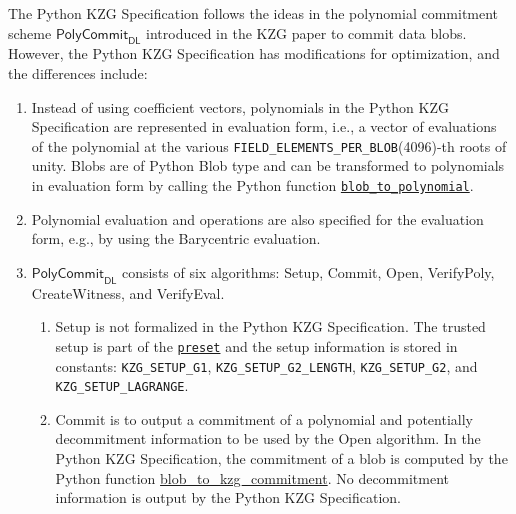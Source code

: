 \documentclass[12pt]{galois-whitepaper}
\begin{document}
The Python KZG Specification follows the ideas in the polynomial commitment scheme $\textsf{PolyCommit}_{\textsf{DL}}$ introduced in the KZG paper to commit data blobs. 
However, the Python KZG Specification has modifications for optimization, and the differences include:
\begin{enumerate}
    \item Instead of using coefficient vectors, polynomials in the Python KZG Specification are represented in evaluation form, i.e., a vector of evaluations of the polynomial at the various \texttt{FIELD\_ELEMENTS\_PER\_BLOB}(4096)-th roots of unity.
    Blobs are of Python Blob type and can be transformed to polynomials in evaluation form by calling the Python function \href{https://github.com/ethereum/consensus-specs/blob/dev/specs/deneb/polynomial-commitments.md\#blob_to_polynomial}{\texttt{blob\_to\_polynomial}}.

    \item Polynomial evaluation and operations are also specified for the evaluation form, e.g., by using the Barycentric evaluation.
    
    \item $\textsf{PolyCommit}_{\textsf{DL}}$ consists of six algorithms: \textsf{Setup}, \textsf{Commit}, \textsf{Open}, \textsf{VerifyPoly}, \textsf{CreateWitness}, and \textsf{VerifyEval}.
    
    \begin{enumerate}
    
    \item \textsf{Setup} is not formalized in the Python KZG Specification.
    The trusted setup is part of the \href{https://github.com/ethereum/consensus-specs/blob/dev/specs/deneb/polynomial-commitments.md#verify_kzg_proof_batch}{\texttt{preset}} 
    and the setup information is stored in constants: 
    \texttt{KZG\_SETUP\_G1}, 
    \texttt{KZG\_SETUP\_G2\_LENGTH}, 
    \texttt{KZG\_SETUP\_G2}, 
    and \texttt{KZG\_SETUP\_LAGRANGE}.
    
    \item \textsf{Commit} is to output a commitment of a polynomial and potentially decommitment information to be used by the \textsf{Open} algorithm.
    In the Python KZG Specification, 
    the commitment of a blob is computed by the Python function \href{https://github.com/ethereum/consensus-specs/blob/dev/specs/deneb/polynomial-commitments.md\#blob_to_kzg_commitment}{blob\_to\_kzg\_commitment}.
    No decommitment information is output by the Python KZG Specification.
    

\end{enumerate}
\end{enumerate}
\end{document}
